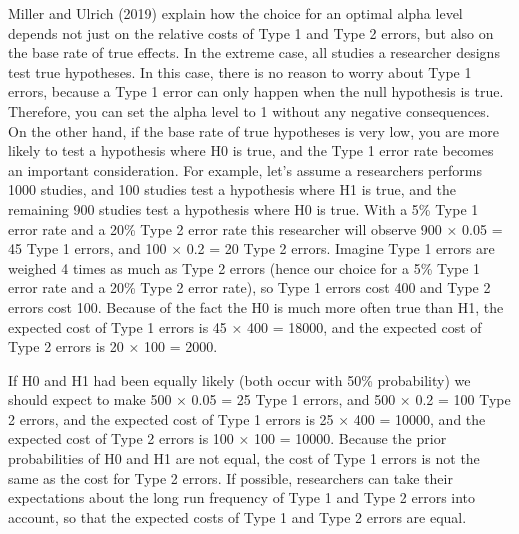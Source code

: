 \documentclass[
  english,
  ,jou, a4paper,floatsintext]{apa6}
\begin{document}
Miller and Ulrich (2019) explain how the choice for an optimal alpha level depends not just on the relative costs of Type 1 and Type 2 errors, but also on the base rate of true effects. In the extreme case, all studies a researcher designs test true hypotheses. In this case, there is no reason to worry about Type 1 errors, because a Type 1 error can only happen when the null hypothesis is true. Therefore, you can set the alpha level to 1 without any negative consequences. On the other hand, if the base rate of true hypotheses is very low, you are more likely to test a hypothesis where H0 is true, and the Type 1 error rate becomes an important consideration. For example, let's assume a researchers performs 1000 studies, and 100 studies test a hypothesis where H1 is true, and the remaining 900 studies test a hypothesis where H0 is true. With a 5\% Type 1 error rate and a 20\% Type 2 error rate this researcher will observe 900 × 0.05 = 45 Type 1 errors, and 100 × 0.2 = 20 Type 2 errors. Imagine Type 1 errors are weighed 4 times as much as Type 2 errors (hence our choice for a 5\% Type 1 error rate and a 20\% Type 2 error rate), so Type 1 errors cost 400 and Type 2 errors cost 100. Because of the fact the H0 is much more often true than H1, the expected cost of Type 1 errors is 45 × 400 = 18000, and the expected cost of Type 2 errors is 20 × 100 = 2000.

If H0 and H1 had been equally likely (both occur with 50\% probability) we should expect to make 500 × 0.05 = 25 Type 1 errors, and 500 × 0.2 = 100 Type 2 errors, and the expected cost of Type 1 errors is 25 × 400 = 10000, and the expected cost of Type 2 errors is 100 × 100 = 10000. Because the prior probabilities of H0 and H1 are not equal, the cost of Type 1 errors is not the same as the cost for Type 2 errors. If possible, researchers can take their expectations about the long run frequency of Type 1 and Type 2 errors into account, so that the expected costs of Type 1 and Type 2 errors are equal.
\end{document}
